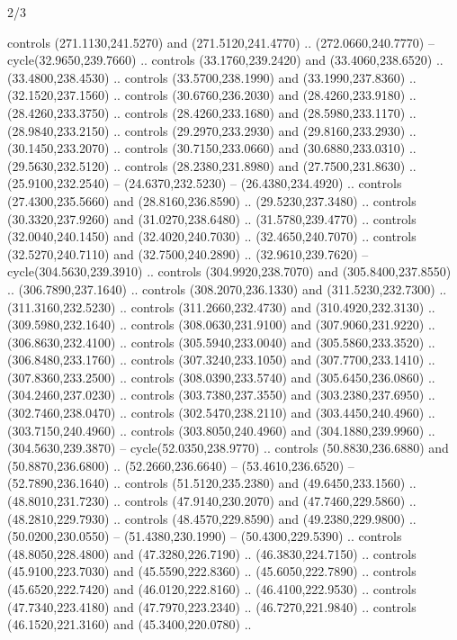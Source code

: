 \begin{flagdescription}{2/3}
\begin{scope}[xshift=0.5\flaglength,yshift=0.5\flagwidth,scale=\stretchfactor]
\begin{scope}[scale=0.001645\flagwidth,yshift=65mm,xshift=-63mm]
\begin{scope}[y=0.80pt, x=0.80pt, yscale=-1,]
\begin{scope}[cm={{1.33333,0.0,0.0,1.33333,(0.0,1e-05)}}]
  controls (271.1130,241.5270) and (271.5120,241.4770) .. (272.0660,240.7770) --
  cycle(32.9650,239.7660) .. controls (33.1760,239.2420) and (33.4060,238.6520)
  .. (33.4800,238.4530) .. controls (33.5700,238.1990) and (33.1990,237.8360) ..
  (32.1520,237.1560) .. controls (30.6760,236.2030) and (28.4260,233.9180) ..
  (28.4260,233.3750) .. controls (28.4260,233.1680) and (28.5980,233.1170) ..
  (28.9840,233.2150) .. controls (29.2970,233.2930) and (29.8160,233.2930) ..
  (30.1450,233.2070) .. controls (30.7150,233.0660) and (30.6880,233.0310) ..
  (29.5630,232.5120) .. controls (28.2380,231.8980) and (27.7500,231.8630) ..
  (25.9100,232.2540) -- (24.6370,232.5230) -- (26.4380,234.4920) .. controls
  (27.4300,235.5660) and (28.8160,236.8590) .. (29.5230,237.3480) .. controls
  (30.3320,237.9260) and (31.0270,238.6480) .. (31.5780,239.4770) .. controls
  (32.0040,240.1450) and (32.4020,240.7030) .. (32.4650,240.7070) .. controls
  (32.5270,240.7110) and (32.7500,240.2890) .. (32.9610,239.7620) --
  cycle(304.5630,239.3910) .. controls (304.9920,238.7070) and
  (305.8400,237.8550) .. (306.7890,237.1640) .. controls (308.2070,236.1330) and
  (311.5230,232.7300) .. (311.3160,232.5230) .. controls (311.2660,232.4730) and
  (310.4920,232.3130) .. (309.5980,232.1640) .. controls (308.0630,231.9100) and
  (307.9060,231.9220) .. (306.8630,232.4100) .. controls (305.5940,233.0040) and
  (305.5860,233.3520) .. (306.8480,233.1760) .. controls (307.3240,233.1050) and
  (307.7700,233.1410) .. (307.8360,233.2500) .. controls (308.0390,233.5740) and
  (305.6450,236.0860) .. (304.2460,237.0230) .. controls (303.7380,237.3550) and
  (303.2380,237.6950) .. (302.7460,238.0470) .. controls (302.5470,238.2110) and
  (303.4450,240.4960) .. (303.7150,240.4960) .. controls (303.8050,240.4960) and
  (304.1880,239.9960) .. (304.5630,239.3870) -- cycle(52.0350,238.9770) ..
  controls (50.8830,236.6880) and (50.8870,236.6800) .. (52.2660,236.6640) --
  (53.4610,236.6520) -- (52.7890,236.1640) .. controls (51.5120,235.2380) and
  (49.6450,233.1560) .. (48.8010,231.7230) .. controls (47.9140,230.2070) and
  (47.7460,229.5860) .. (48.2810,229.7930) .. controls (48.4570,229.8590) and
  (49.2380,229.9800) .. (50.0200,230.0550) -- (51.4380,230.1990) --
  (50.4300,229.5390) .. controls (48.8050,228.4800) and (47.3280,226.7190) ..
  (46.3830,224.7150) .. controls (45.9100,223.7030) and (45.5590,222.8360) ..
  (45.6050,222.7890) .. controls (45.6520,222.7420) and (46.0120,222.8160) ..
  (46.4100,222.9530) .. controls (47.7340,223.4180) and (47.7970,223.2340) ..
  (46.7270,221.9840) .. controls (46.1520,221.3160) and (45.3400,220.0780) ..

\end{scope}
\end{scope}
\end{scope}
\end{scope}
\end{flagdescription}
